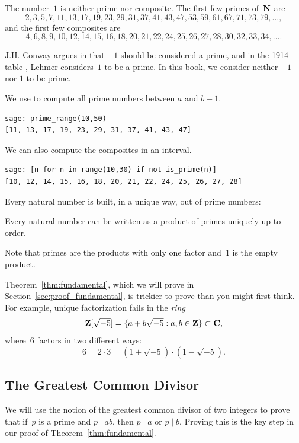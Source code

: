The number~$1$ is neither prime nor composite.  The first few
primes of~$\mathbf{N}$ are $$
2,3,5,7,11, 13, 17, 19, 23, 29, 31, 37, 41, 43,
47, 53, 59, 61, 67, 71, 73, 79, \ldots, $$
and the first few
composites are $$
4,6,8,9,10,12, 14, 15, 16, 18, 20, 21, 22, 24, 25,
26, 27, 28, 30, 32, 33, 34, \ldots.  $$

\begin{remark}
  J.\thinspace{}H. Conway argues in \cite[viii]{conway:sensual} that
  $-1$ should be considered a prime, and in the 1914 table
  \cite{lehmer:primetable}, Lehmer considers~$1$ to be a prime.
In this book, we consider neither $-1$ nor $1$ to be prime.
\end{remark}

\begin{sg}
We use \sage to compute all prime numbers between $a$ and $b-1$.
\begin{verbatim}
sage: prime_range(10,50)
[11, 13, 17, 19, 23, 29, 31, 37, 41, 43, 47]
\end{verbatim}
\noindent{}We can also compute the composites in an interval.
\begin{verbatim}
sage: [n for n in range(10,30) if not is_prime(n)]
[10, 12, 14, 15, 16, 18, 20, 21, 22, 24, 25, 26, 27, 28]
\end{verbatim}
\end{sg}

\noindent{}Every natural number is built, in a unique way, out of prime numbers:
\begin{theorem}\label{thm:fundamental}%
%
%
%
Every natural number can be written as a product of primes
uniquely up to order.
\end{theorem}
Note that primes are the products with only one factor and~$1$ is the
empty product.

\begin{remark}
Theorem~\ref{thm:fundamental}, which we will prove in
Section~\ref{sec:proof_fundamental}, is trickier to prove than you
might first think.  For example, unique factorization fails in the {\em ring}
$$
 \mathbf{Z}[\sqrt{-5}] = \{a + b\sqrt{-5} : a, b\in\mathbf{Z}\} \subset \mathbf{C},
$$
where~$6$ factors in two different ways:
$$
 6 = 2\cdot 3 = (1+\sqrt{-5})\cdot (1-\sqrt{-5}).
$$
\end{remark}

\subsection{The Greatest Common Divisor}
We will use the notion of the greatest common divisor of two integers to
prove that if~$p$ is a prime and $p\mid ab$, then $p\mid a$ or $p\mid
b$.  Proving this is the key step in our proof of
Theorem~\ref{thm:fundamental}.

